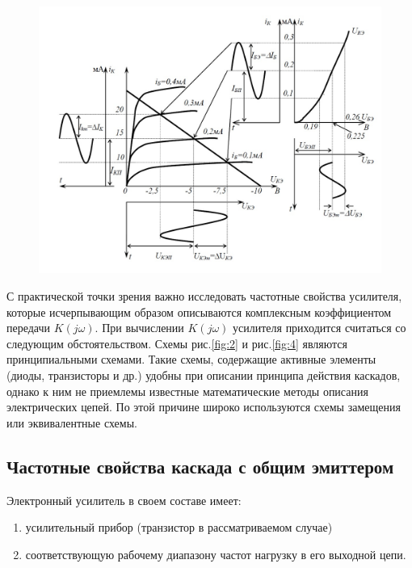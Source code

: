 \begin{figure}[ht]
	\centering
	\includegraphics[width=\linewidth]{fig/fig3}
	\caption{}
	\label{fig:3}
\end{figure}

С практической точки зрения важно исследовать частотные свойства усилителя, которые исчерпывающим образом описываются комплексным коэффициентом передачи $K(j\omega)$. При вычислении $K(j\omega)$ усилителя приходится считаться со следующим обстоятельством. Схемы рис.\ref{fig:2} и рис.\ref{fig:4} являются принципиальными схемами. Такие схемы, содержащие активные элементы (диоды, транзисторы и др.) удобны при описании принципа действия каскадов, однако к ним не приемлемы известные математические методы описания электрических цепей. По этой причине широко используются схемы замещения или эквивалентные схемы.

\subsection{Частотные свойства каскада с общим эмиттером}
Электронный усилитель в своем составе имеет:
\begin{enumerate}
	\item усилительный прибор (транзистор в рассматриваемом случае)
	\item соответствующую рабочему диапазону частот нагрузку в его выходной цепи.
\end{enumerate}

